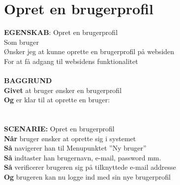 \section{Opret en brugerprofil}
{\color{blue}\textbf{EGENSKAB}:} Opret en brugerprofil \\
Som bruger \\
Ønsker jeg at kunne oprette en brugerprofil på websiden \\
For at få adgang til websidens funktionalitet\\ \\
{\color{blue}\textbf{BAGGRUND}} \\
{\color{blue}\textbf{Givet}} at bruger ønsker en brugerprofil \\
{\color{blue}\textbf{Og}} er klar til at oprette en bruger:\\
 \\\\
{\color{blue}\textbf{SCENARIE:}} Opret en brugerprofil \\
{\color{blue}\textbf{Når}} bruger ønsker at oprette sig i systemet \\
{\color{blue}\textbf{Så}} navigerer han til Menupunktet ”Ny bruger” \\
{\color{blue}\textbf{Så}} indtaster han brugernavn, e-mail, password mm.\\
{\color{blue}\textbf{Så}} verificerer brugeren sig på tilknyttede e-mail addresse\\
{\color{blue}\textbf{Og}} brugeren kan nu logge ind med sin nye brugerprofil